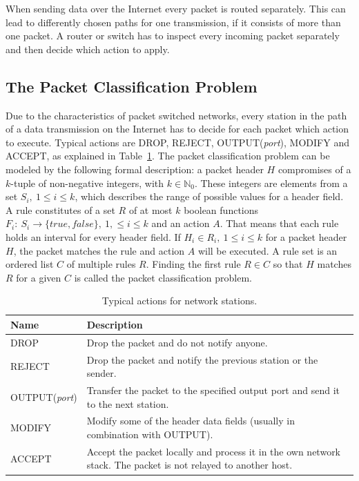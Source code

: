\documentclass[a4paper,
		12pt,
		parskip=full,
		titlepage
		]{scrartcl}
\begin{document}
When sending data over the Internet every packet is routed separately.
This can lead to differently chosen paths for one transmission, if it consists of more than one packet.
A router or switch has to inspect every incoming packet separately and then decide which action to apply.

\subsection{The Packet Classification Problem}

Due to the characteristics of packet switched networks, every station in the path of a data transmission on the Internet 
has to decide for each packet which action to execute.
Typical actions are DROP, REJECT, OUTPUT(\textit{port}), MODIFY and ACCEPT, as explained in Table~\ref{table:actions}.
The packet classification problem can be modeled by the following formal description:
a packet header $H$ compromises of a $k$-tuple of non-negative integers, with $k \in \mathds{N}_0$.
These integers are elements from a set $S_i,\ 1 \leq i \leq k$, which describes the range of possible values for a header field.
A rule constitutes of a set $R$ of at most $k$ boolean functions
$F_i:\ S_i \rightarrow \{true, false\},\ 1,\leq i \leq k$ and an action $A$.
That means that each rule holds an interval for every header field.
If $H_i \in R_i,\ 1 \leq i \leq k$ for a packet header $H$, the packet matches the rule and action $A$ will be executed.
A rule set is an ordered list $C$ of multiple rules $R$.
Finding the first rule $R \in C$ so that $H$ matches 
$R$ for a given $C$ is called the packet classification problem.

\begin{table}[H]
  \centering
  \begin{tabularx}{\textwidth}{l|X}
  Name&Description\\
  \hline
  DROP&Drop the packet and do not notify anyone.\\
  REJECT&Drop the packet and notify the previous station or the sender.\\
  OUTPUT(\textit{port})&Transfer the packet to the specified output port and send it to the next station.\\
  MODIFY&Modify some of the header data fields (usually in combination with OUTPUT).\\
  ACCEPT&Accept the packet locally and process it in the own network stack. The packet is not relayed to another host.\\
  \end{tabularx}
  \caption{Typical actions for network stations.}
  \label{table:actions}
\end{table}
\end{document}
